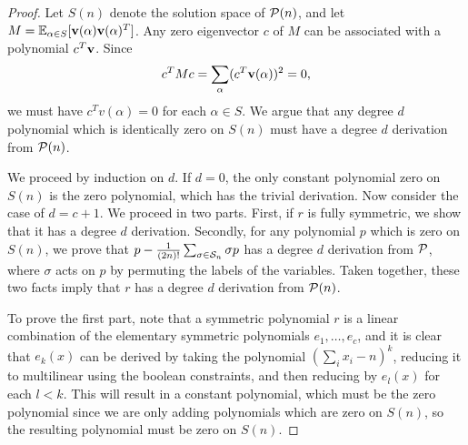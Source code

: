 \begin{proof}
Let $S(n)$ denote the solution space of $\mathcal P(n)$, and let $M = \operatorname*{\mathbb{E}}_{\alpha \in S}[{\bf v}(\alpha){\bf v}(\alpha)^T]$. Any zero eigenvector $c$ of $M$ can be associated with a polynomial $c^T{\bf v}$. Since 
\[c^TMc = \sum_\alpha (c^T{\bf v}(\alpha))^2 = 0,\]
we must have $c^Tv(\alpha) = 0$ for each $\alpha \in S$. We argue that any degree $d$ polynomial which is identically zero on $S(n)$ must have a degree $d$ derivation from $\mathcal P(n)$. 

We proceed by induction on $d$. If $d = 0$, the only constant polynomial zero on $S(n)$ is the zero polynomial, which has the trivial derivation. Now consider the case of $d = c+1$. We proceed in two parts. First, if $r$ is fully symmetric, we show that it has a degree $d$ derivation. Secondly, for any polynomial $p$ which is zero on $S(n)$, we prove that $p - \frac{1}{(2n)!}\sum_{\sigma \in \mathcal S_n} \sigma p$ has a degree $d$ derivation from $\mathcal P$, where $\sigma$ acts on $p$ by permuting the labels of the variables. Taken together, these two facts imply that $r$ has a degree $d$ derivation from $\mathcal P(n)$.

To prove the first part, note that a symmetric polynomial $r$ is a linear combination of the elementary symmetric polynomials $e_1,\dots,e_c$, and it is clear that $e_k(x)$ can be derived by taking the polynomial $(\sum_i x_i - n)^k$, reducing it to multilinear using the boolean constraints, and then reducing by $e_l(x)$ for each $l < k$. This will result in a constant polynomial, which must be the zero polynomial since we are only adding polynomials which are zero on $S(n)$, so the resulting polynomial must be zero on $S(n)$. 


\end{proof}
